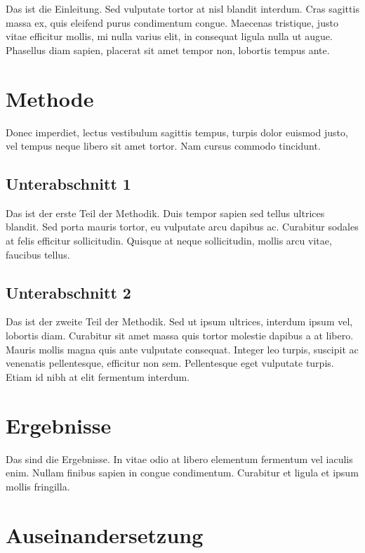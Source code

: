 \documentclass[listof=totoc,index=totoc,bibliography=totoc,12pt,ngerman,a4paper,]{report}
\begin{document}
Das ist die Einleitung. Sed vulputate tortor at nisl blandit interdum.
Cras sagittis massa ex, quis eleifend purus condimentum congue. Maecenas
tristique, justo vitae efficitur mollis, mi nulla varius elit, in
consequat ligula nulla ut augue. Phasellus diam sapien, placerat sit
amet tempor non, lobortis tempus ante.

\section{Methode}\label{methode-1}

Donec imperdiet, lectus vestibulum sagittis tempus, turpis dolor euismod
justo, vel tempus neque libero sit amet tortor. Nam cursus commodo
tincidunt.

\subsection{Unterabschnitt 1}\label{unterabschnitt-1}

Das ist der erste Teil der Methodik. Duis tempor sapien sed tellus
ultrices blandit. Sed porta mauris tortor, eu vulputate arcu dapibus ac.
Curabitur sodales at felis efficitur sollicitudin. Quisque at neque
sollicitudin, mollis arcu vitae, faucibus tellus.

\subsection{Unterabschnitt 2}\label{unterabschnitt-2-1}

Das ist der zweite Teil der Methodik. Sed ut ipsum ultrices, interdum
ipsum vel, lobortis diam. Curabitur sit amet massa quis tortor molestie
dapibus a at libero. Mauris mollis magna quis ante vulputate consequat.
Integer leo turpis, suscipit ac venenatis pellentesque, efficitur non
sem. Pellentesque eget vulputate turpis. Etiam id nibh at elit fermentum
interdum.

\section{Ergebnisse}\label{ergebnisse-1}

Das sind die Ergebnisse. In vitae odio at libero elementum fermentum vel
iaculis enim. Nullam finibus sapien in congue condimentum. Curabitur et
ligula et ipsum mollis fringilla.

\section{Auseinandersetzung}\label{auseinandersetzung-1}
\end{document}
